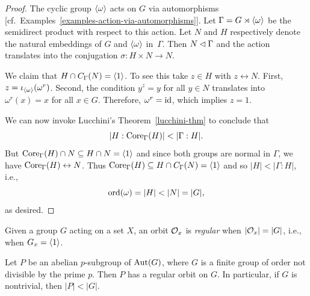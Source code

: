 \begin{proof} The cyclic group $\langle\omega\rangle$ acts on $G$ via automorphisms [cf.~Examples~\ref{examples-action-via-automorphisms}]. Let $\Gamma=G\rtimes\langle\omega\rangle$ be the semidirect product with respect to this action. Let $N$ and $H$ respectively denote the natural embeddings of $G$ and $\langle\omega\rangle$ in~$\Gamma$. Then $N\lhd\Gamma$ and the action translates into the conjugation $\sigma\colon H\times N\to N$.

We claim that $H\cap C_\Gamma(N)=\langle1\rangle$. To see this take $z\in H$ with $z\leftrightarrow N$. First, $z=\iota_{\langle\omega\rangle}(\omega^r)$. Second, the condition $y^z=y$ for all $y\in N$ translates into $\omega^r(x)=x$ for all $x\in G$. Therefore, $\omega^r=\operatorname{id}$, which implies $z=1$.

We can now invoke Lucchini's Theorem~\ref{lucchini-thm} to conclude that $$
    |H:\Core_\Gamma(H)|<|\Gamma:H|.
$$
But ${\rm Core}_\Gamma(H)\cap N\subseteq H\cap N=\langle1\rangle$ and since both groups are normal in $\Gamma$, we have ${\rm Core}_\Gamma(H)\leftrightarrow N$. Thus ${\rm Core}_\Gamma(H)\subseteq H\cap C_\Gamma(N)=\langle1\rangle$ and so $|H|<|\Gamma: H|$, i.e.,
$$
    {\rm ord}(\omega) = |H| < |N| = |G|,
$$
as desired.  \end{proof}

\begin{defn}
    Given a group\/ $G$ acting on a set\/ $X$, an orbit\/ ${\cal O}_x$ is \textsl{regular} when\/ $|{\cal O}_x|=|G|$, i.e., when\/ $G_x=\langle1\rangle$.
\end{defn}

\begin{cor}\label{regular-aut-orbit}
    Let\/ $P$ be an abelian\/ $p$-subgroup of\/ ${\rm Aut}(G)$, where\/ $G$ is a finite group of order not divisible by the prime\/ $p$. Then\/ $P$ has a regular orbit on\/ $G$. In particular, if\/ $G$ is nontrivial, then\/ $|P| < |G|$.
\end{cor}

